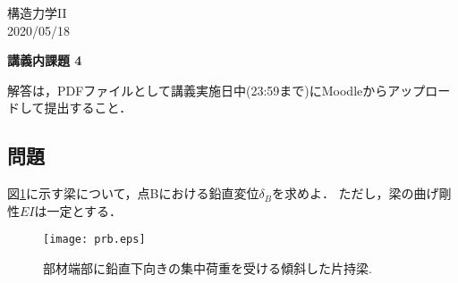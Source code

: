 \documentclass[10pt,a4j]{jarticle}
\newlength{\minitwocolumn}
\begin{document}
\newcommand{\fat}[1]{\mbox{\boldmath $#1$}}
\newcommand{\D}{\partial}
\newcommand{\w}{\omega}
\newcommand{\ga}{\alpha}
\newcommand{\gb}{\beta}
\newcommand{\gx}{\xi}
\newcommand{\gz}{\zeta}
\newcommand{\vhat}[1]{\hat{\fat{#1}}}
\newcommand{\spc}{\vspace{0.7\baselineskip}}
\newcommand{\halfspc}{\vspace{0.3\baselineskip}}

\newcommand{\twofig}[2]
 {
   \begin{figure}
     \begin{minipage}[t]{\minitwocolumn}
         \begin{center}   #1
         \end{center}
     \end{minipage}
         \hspace{\columnsep}
     \begin{minipage}[t]{\minitwocolumn}
         \begin{center} #2
         \end{center}
     \end{minipage}
   \end{figure}
 }
\begin{flushright}
	構造力学II\\
	 2020/05/18
\end{flushright}
\begin{center}
	{\LARGE	\bf 講義内課題 4} 
\end{center}
\vspace{10mm}
解答は，PDFファイルとして講義実施日中(23:59まで)にMoodleからアップロードして提出すること．
\subsection*{問題}
図\ref{fig:prb}に示す梁について，点Bにおける鉛直変位$\delta_B$を求めよ．
ただし，梁の曲げ剛性$EI$は一定とする．
\begin{figure}[h]
	\begin{center}
	\texttt{[image: prb.eps]} 
	\end{center}
	\caption{部材端部に鉛直下向きの集中荷重を受ける傾斜した片持梁.} 
	\label{fig:prb}
\end{figure}
\end{document}
